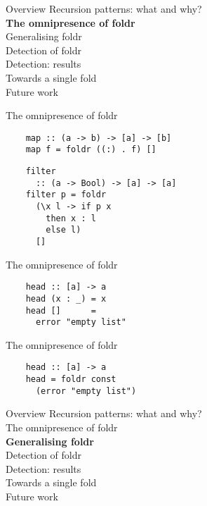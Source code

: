 \documentclass[20pt]{beamer}
\begin{document}
\begin{frame}{Overview}
    Recursion patterns: what and why? \\
    \textbf{The omnipresence of foldr} \\
    Generalising foldr \\
    Detection of foldr \\
    Detection: results \\
    Towards a single fold \\
    Future work \\
\end{frame}

\begin{frame}[fragile]{The omnipresence of foldr}
    \begin{lstlisting}
    map :: (a -> b) -> [a] -> [b]
    map f = foldr ((:) . f) []
    \end{lstlisting}

    \begin{lstlisting}
    filter
      :: (a -> Bool) -> [a] -> [a]
    filter p = foldr
      (\x l -> if p x
        then x : l
        else l)
      []
    \end{lstlisting}
\end{frame}

\begin{frame}[fragile]{The omnipresence of foldr}
    \begin{lstlisting}
    head :: [a] -> a
    head (x : _) = x
    head []      =
      error "empty list"
    \end{lstlisting}
\end{frame}

\begin{frame}[fragile]{The omnipresence of foldr}
    \begin{lstlisting}
    head :: [a] -> a
    head = foldr const
      (error "empty list")
    \end{lstlisting}
\end{frame}


\begin{frame}{Overview}
    Recursion patterns: what and why? \\
    The omnipresence of foldr \\
    \textbf{Generalising foldr} \\
    Detection of foldr \\
    Detection: results \\
    Towards a single fold \\
    Future work \\
\end{frame}
\end{document}
